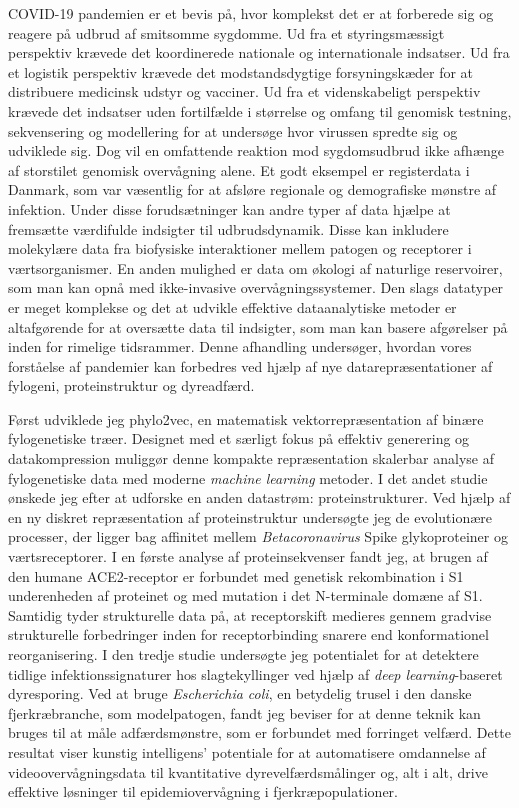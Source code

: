 COVID-19 pandemien er et bevis på, hvor komplekst det er at forberede sig og reagere på udbrud af smitsomme sygdomme. Ud fra et styringsmæssigt perspektiv krævede det koordinerede nationale og internationale indsatser. Ud fra et logistik perspektiv krævede det modstandsdygtige forsyningskæder for at distribuere medicinsk udstyr og vacciner. Ud fra et videnskabeligt perspektiv krævede det indsatser uden fortilfælde i størrelse og omfang til genomisk testning, sekvensering og modellering for at undersøge hvor virussen spredte sig og udviklede sig. Dog vil en omfattende reaktion mod sygdomsudbrud ikke afhænge af storstilet genomisk overvågning alene. Et godt eksempel er registerdata i Danmark, som var væsentlig for at afsløre regionale og demografiske mønstre af infektion. Under disse forudsætninger kan andre typer af data hjælpe at fremsætte værdifulde indsigter til udbrudsdynamik. Disse kan inkludere molekylære data fra biofysiske interaktioner mellem patogen og receptorer i værtsorganismer. En anden mulighed er data om økologi af naturlige reservoirer, som man kan opnå med ikke-invasive overvågningssystemer. Den slags datatyper er meget komplekse og det at udvikle effektive dataanalytiske metoder er altafgørende for at oversætte data til indsigter, som man kan basere afgørelser på inden for rimelige tidsrammer. Denne afhandling undersøger, hvordan vores forståelse af pandemier kan forbedres ved hjælp af nye datarepræsentationer af fylogeni, proteinstruktur og dyreadfærd.

Først udviklede jeg phylo2vec, en matematisk vektorrepræsentation af binære fylogenetiske træer. Designet med et særligt fokus på effektiv generering og datakompression muliggør denne kompakte repræsentation skalerbar analyse af fylogenetiske data med moderne \textit{machine learning} metoder. I det andet studie ønskede jeg efter at udforske en anden datastrøm: proteinstrukturer. Ved hjælp af en ny diskret repræsentation af proteinstruktur undersøgte jeg de evolutionære processer, der ligger bag affinitet mellem \textit{Betacoronavirus} Spike glykoproteiner og værtsreceptorer. I en første analyse af proteinsekvenser fandt jeg, at brugen af den humane ACE2-receptor er forbundet med genetisk rekombination i S1 underenheden af proteinet og med mutation i det N-terminale domæne af S1. Samtidig tyder strukturelle data på, at receptorskift medieres gennem gradvise strukturelle forbedringer inden for receptorbinding snarere end konformationel reorganisering. I den tredje studie undersøgte jeg potentialet for at detektere tidlige infektionssignaturer hos slagtekyllinger ved hjælp af \textit{deep learning}-baseret dyresporing. Ved at bruge \textit{Escherichia coli}, en betydelig trusel i den danske fjerkræbranche, som modelpatogen, fandt jeg beviser for at denne teknik kan bruges til at måle adfærdsmønstre, som er forbundet med forringet velfærd. Dette resultat viser kunstig intelligens' potentiale for at automatisere omdannelse af videoovervågningsdata til kvantitative dyrevelfærdsmålinger og, alt i alt, drive effektive løsninger til epidemiovervågning i fjerkræpopulationer.

